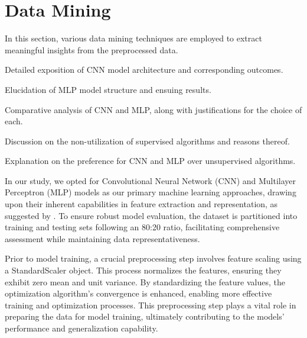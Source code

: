 \section{Data Mining}\label{data_mining}

In this section, various data mining techniques are employed to extract meaningful insights from the preprocessed data.

\begin{description}[style=nextline]
    \item[Convolution Neural Network (CNN):] Detailed exposition of CNN model architecture and corresponding outcomes.
    \item[Multilayer Perceptron (MLP):] Elucidation of MLP model structure and ensuing results.
    \item[Comparison Between CNN and MLP:] Comparative analysis of CNN and MLP, along with justifications for the choice of each.
    \item[Supervised Machine Learning Algorithms:] Discussion on the non-utilization of supervised algorithms and reasons thereof.
    \item[Unsupervised Machine Learning Algorithms:] Explanation on the preference for CNN and MLP over unsupervised algorithms.
\end{description}


In our study, we opted for Convolutional Neural Network (CNN) and Multilayer Perceptron (MLP) models as our primary machine learning approaches, drawing upon their inherent capabilities in feature extraction and representation, as suggested by \cite{jiang_uwb_2020}. To ensure robust model evaluation, the dataset is partitioned into training and testing sets following an 80:20 ratio, facilitating comprehensive assessment while maintaining data representativeness.

Prior to model training, a crucial preprocessing step involves feature scaling using a StandardScaler object. This process normalizes the features, ensuring they exhibit zero mean and unit variance. By standardizing the feature values, the optimization algorithm's convergence is enhanced, enabling more effective training and optimization processes. This preprocessing step plays a vital role in preparing the data for model training, ultimately contributing to the models' performance and generalization capability.



